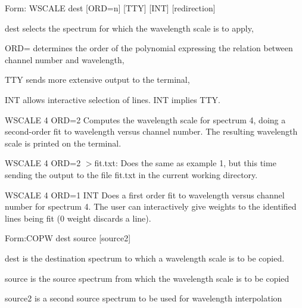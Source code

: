 {\newpage\clearpage
{}%
\begin{command}
  \item[Form: WSCALE dest {[ORD=n]} {[TTY]} {[INT]} {[redirection]}\hfill]{}
  \item[dest]{selects the spectrum for which the wavelength scale is to apply,}
  \item[ORD=]{determines the order of the polynomial 
       expressing the relation between channel number and wavelength,}
  \item[TTY]{sends more extensive output to the terminal,}
  \item[INT]{allows interactive selection of lines.  INT implies TTY.}
\end{command}%
\lthtmlfigureZ
\lthtmlcheckvsize\clearpage}

{\newpage\clearpage
{}%
\begin{example}
  \item[WSCALE 4 ORD=2\hfill]{ Computes the wavelength scale for spectrum
       4, doing a second-order fit to wavelength versus channel number. The
       resulting wavelength scale is printed on the terminal.}
\par\item[WSCALE 4 ORD=2 $>$fit.txt:\hfill]{ Does the same as example 1, but
       this time sending the output to the file fit.txt in the
       current working directory.}
\par\item[WSCALE 4 ORD=1 INT\hfill]{ Does a first order fit to wavelength
       versus channel number for spectrum 4.  The user can interactively
       give weights to the identified lines being fit (0 weight discards a
       line).}
\end{example}%
\lthtmlfigureZ
\lthtmlcheckvsize\clearpage}

{\newpage\clearpage
{}%
\begin{command}
  \item[Form:COPW dest source {[source2]}\hfill]{}
  \item[dest]{is the destination spectrum to which a wavelength scale is to
       be copied.}
  \item[source]{is the source spectrum from which the wavelength scale is
       to be copied}
  \item[source2]{is a second source spectrum to be used for wavelength
       interpolation}
\end{command}%
\lthtmlfigureZ
\lthtmlcheckvsize\clearpage}


